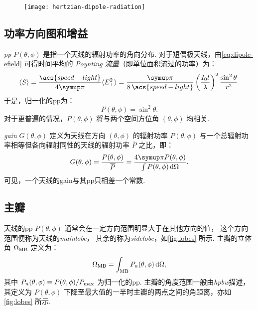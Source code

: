 \begin{figure}[htp]
  \centering
  \texttt{[image: hertzian-dipole-radiation]}
  \label{fig:dipole-radiation}
\end{figure}

\subsection{功率方向图和增益}

\emph{\acf{pp}} $P(\theta,\phi)$ 是指一个天线的辐射功率的角向分布.
对于短偶极天线，由\autoref{eq:dipole-efield} 可得时间平均的
\emph{Poynting 流量}（即单位面积流过的功率）为：
\begin{equation}
  \label{eq:poynting-flux}
  \langle S \rangle
    = \frac{\acs{speed-light}}{4\Cpi} \langle E_{\bot}^2 \rangle
    = \frac{\Cpi}{8\,\acs{speed-light}}
      \left( \frac{I_0 l}{\lambda} \right)^2 \frac{\sin^2\theta}{r^2} .
\end{equation}
于是，归一化的\ac{pp}为：
\begin{equation}
  \label{eq:power-pattern}
  P(\theta,\phi) = \sin^2\theta .
\end{equation}
对于更普遍的情况，$P(\theta,\phi)$ 将与两个空间方位角 $(\theta, \phi)$
均相关.

\emph{\acf{gain}} $G(\theta,\phi)$ 定义为天线在方向 $(\theta, \phi)$
的辐射功率 $P(\theta,\phi)$ 与一个总辐射功率相等但各向辐射同性的天线的辐射功率
$\overline{P}$ 之比，即：
\begin{equation}
  \label{eq:gain}
  G(\theta,\phi) = \frac{P(\theta,\phi)}{\overline{P}}
    = \frac{4\Cpi P(\theta,\phi)}{\int P(\theta,\phi) \,\D{\Omega}} .
\end{equation}
可见，一个天线的\ac{gain}与其\ac{pp}只相差一个常数.

\subsection{主瓣}

天线的\ac{pp} $P(\theta,\phi)$ 通常会在一定方向范围明显大于在其他方向的值，
这个方向范围便称为天线的\emph{\acf{mainlobe}}，
其余的称为\emph{\acf{sidelobe}}，如\autoref{fig:lobes} 所示.
主瓣的立体角 $\Omega_{\mathrm{MB}}$ 定义为：
\begin{equation}
  \label{eq:omega-mb}
  \Omega_{\mathrm{MB}} = \int_{\mathrm{MB}} P_n(\theta,\phi) \,\mathrm{d}\Omega ,
\end{equation}
其中 $P_n(\theta,\phi) \equiv P(\theta,\phi) / P_{\mathrm{max}}$
为归一化的\ac{pp}.
主瓣的角度范围一般由\emph{\acf{hpbw}}描述，其定义为 $P(\theta,\phi)$
下降至最大值的一半时主瓣的两点之间的角距离，亦如\autoref{fig:lobes} 所示.

